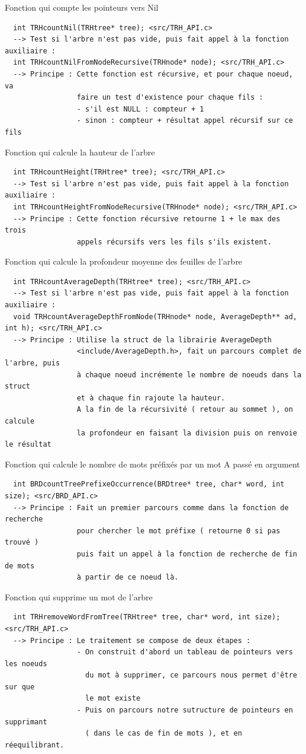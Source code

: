 \documentclass[a4paper,8pt]{report}
\begin{document}
Fonction qui compte les pointeurs vers Nil
\begin{verbatim}
  int TRHcountNil(TRHtree* tree); <src/TRH_API.c>
  --> Test si l'arbre n'est pas vide, puis fait appel à la fonction auxiliaire :
  int TRHcountNilFromNodeRecursive(TRHnode* node); <src/TRH_API.c>
  --> Principe : Cette fonction est récursive, et pour chaque noeud, va
                 faire un test d'existence pour chaque fils :
                 - s'il est NULL : compteur + 1
                 - sinon : compteur + résultat appel récursif sur ce fils
\end{verbatim}
Fonction qui calcule la hauteur de l'arbre
\begin{verbatim}
  int TRHcountHeight(TRHtree* tree); <src/TRH_API.c>
  --> Test si l'arbre n'est pas vide, puis fait appel à la fonction auxiliaire :
  int TRHcountHeightFromNodeRecursive(TRHnode* node); <src/TRH_API.c>
  --> Principe : Cette fonction récursive retourne 1 + le max des trois
                 appels récursifs vers les fils s'ils existent.
\end{verbatim}
Fonction qui calcule la profondeur moyenne des feuilles de l'arbre
\begin{verbatim}
  int TRHcountAverageDepth(TRHtree* tree); <src/TRH_API.c>
  --> Test si l'arbre n'est pas vide, puis fait appel à la fonction auxiliaire :
  void TRHcountAverageDepthFromNode(TRHnode* node, AverageDepth** ad, int h); <src/TRH_API.c>
  --> Principe : Utilise la struct de la librairie AverageDepth
                 <include/AverageDepth.h>, fait un parcours complet de l'arbre, puis
                 à chaque noeud incrémente le nombre de noeuds dans la struct
                 et à chaque fin rajoute la hauteur.
                 A la fin de la récursivité ( retour au sommet ), on calcule
                 la profondeur en faisant la division puis on renvoie le résultat
\end{verbatim}
Fonction qui calcule le nombre de mots préfixés par un mot A passé en argument
\begin{verbatim}
  int BRDcountTreePrefixeOccurrence(BRDtree* tree, char* word, int size); <src/BRD_API.c>
  --> Principe : Fait un premier parcours comme dans la fonction de recherche
                 pour chercher le mot préfixe ( retourne 0 si pas trouvé )
                 puis fait un appel à la fonction de recherche de fin de mots
                 à partir de ce noeud là.
\end{verbatim}
Fonction qui supprime un mot de l'arbre
\begin{verbatim}
  int TRHremoveWordFromTree(TRHtree* tree, char* word, int size); <src/TRH_API.c>
  --> Principe : Le traitement se compose de deux étapes :
                 - On construit d'abord un tableau de pointeurs vers les noeuds
                   du mot à supprimer, ce parcours nous permet d'être sur que
                   le mot existe
                 - Puis on parcours notre sutructure de pointeurs en supprimant
                   ( dans le cas de fin de mots ), et en réequilibrant.
\end{verbatim}
\end{document}
